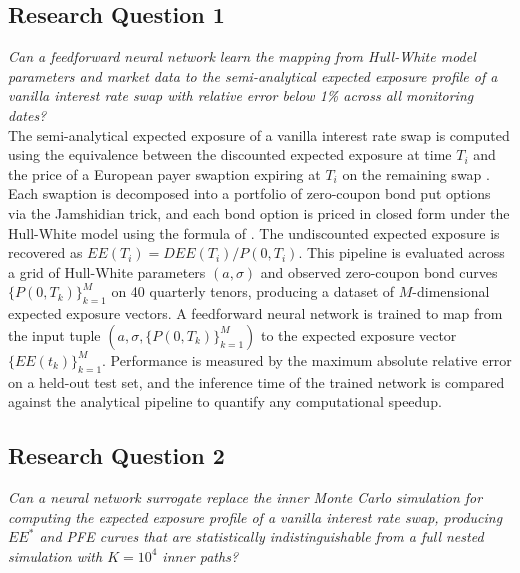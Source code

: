     \subsection*{Research Question 1}                                                        
    \textit{Can a feedforward neural network learn the mapping from Hull-White model parameters and market data to the semi-analytical expected exposure profile of a vanilla interest rate swap with relative error below 1\% across all monitoring dates?} \\
    
    \noindent
    The semi-analytical expected exposure of a vanilla interest rate swap is computed using the equivalence between the discounted expected exposure at time $T_i$ and the price of a European  payer swaption expiring at $T_i$ on the remaining swap \cite{jamshidian1989exact}. Each swaption is decomposed into a portfolio of zero-coupon bond put options via the Jamshidian trick, and each bond option is priced in closed form under the Hull-White model using the formula of \cite{hull1994numerical}. The undiscounted expected exposure is recovered as $EE(T_i) = DEE(T_i) / P(0, T_i)$. This pipeline is evaluated across a grid of Hull-White parameters $(a, \sigma)$ and observed zero-coupon bond curves $\{P(0, T_k)\}_{k=1}^{M}$ on 40 quarterly tenors, producing a dataset of $M$-dimensional expected exposure vectors. A feedforward neural network is trained to map from the input tuple $(a, \sigma, \{P(0, T_k)\}_{k=1}^{M})$ to the expected exposure vector $\{EE(t_k)\}_{k=1}^{M}$. Performance is measured by the maximum absolute relative error on a held-out test set, and the inference time of the trained network is compared against the analytical pipeline to quantify any computational speedup.
    
    \subsection*{Research Question 2}
    
    \textit{Can a neural network surrogate replace the inner Monte Carlo simulation for computing the expected exposure profile of a vanilla interest rate swap, producing $EE^{*}$ and PFE
    curves that are statistically indistinguishable from a full nested simulation with $K = 10^4$ inner paths?}\\
    
